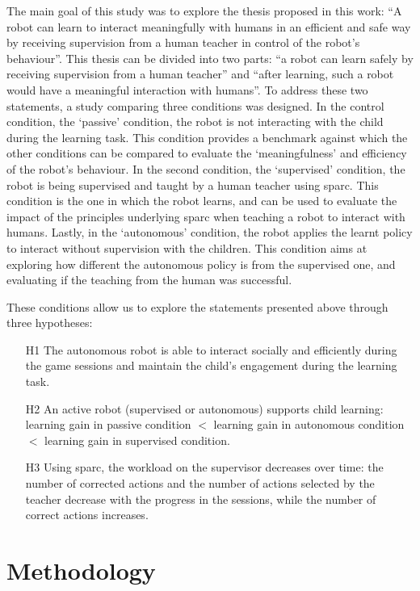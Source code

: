The main goal of this study was to explore the thesis proposed in this work: ``A robot can learn to interact meaningfully with humans in an efficient and safe way by receiving supervision from a human teacher in control of the robot's behaviour''. This thesis can be divided into two parts: ``a robot can learn safely by receiving supervision from a human teacher'' and ``after learning, such a robot would have a meaningful interaction with humans''. To address these two statements, a study comparing three conditions was designed. In the control condition, the `passive' condition, the robot is not interacting with the child during the learning task. This condition provides a benchmark against which the other conditions can be compared to evaluate the `meaningfulness' and efficiency of the robot's behaviour. In the second condition, the `supervised' condition, the robot is being supervised and taught by a human teacher using \gls{sparc}. This condition is the one in which the robot learns, and can be used to evaluate the impact of the principles underlying \gls{sparc} when teaching a robot to interact with humans. Lastly, in the `autonomous' condition, the robot applies the learnt policy to interact without supervision with the children. This condition aims at exploring how different the autonomous policy is from the supervised one, and evaluating if the teaching from the human was successful.

These conditions allow us to explore the statements presented above through three hypotheses:
\begin{itemize}
	\item [H1] The autonomous robot is able to interact socially and efficiently during the game sessions and maintain the child's engagement during the learning task.
	\item [H2] An active robot (supervised or autonomous) supports child learning: learning gain in passive condition $<$ learning gain in autonomous condition $<$ learning gain in supervised condition.
	\item [H3] Using \gls{sparc}, the workload on the supervisor decreases over time: the number of corrected actions and the number of actions selected  by the teacher decrease with the progress in the sessions, while the number of correct actions increases.
\end{itemize}

\section{Methodology}

